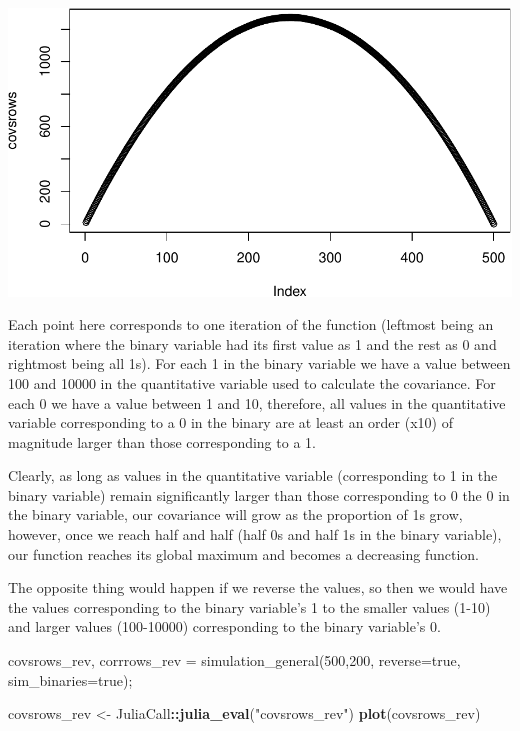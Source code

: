\documentclass[]{article}
\newenvironment{Shaded}{\begin{snugshade}}{\end{snugshade}}
\newcommand{\FloatTok}[1]{\textcolor[rgb]{0.00,0.00,0.81}{#1}}
\newcommand{\KeywordTok}[1]{\textcolor[rgb]{0.13,0.29,0.53}{\textbf{#1}}}
\newcommand{\NormalTok}[1]{#1}
\newcommand{\OperatorTok}[1]{\textcolor[rgb]{0.81,0.36,0.00}{\textbf{#1}}}
\newcommand{\StringTok}[1]{\textcolor[rgb]{0.31,0.60,0.02}{#1}}
\begin{document}
\includegraphics{./figures/unnamed-chunk-11-1.pdf}

Each point here corresponds to one iteration of the function (leftmost
being an iteration where the binary variable had its first value as 1
and the rest as 0 and rightmost being all 1s). For each 1 in the binary
variable we have a value between 100 and 10000 in the quantitative
variable used to calculate the covariance. For each 0 we have a value
between 1 and 10, therefore, all values in the quantitative variable
corresponding to a 0 in the binary are at least an order (x10) of
magnitude larger than those corresponding to a 1.

Clearly, as long as values in the quantitative variable (corresponding
to 1 in the binary variable) remain significantly larger than those
corresponding to 0 the 0 in the binary variable, our covariance will
grow as the proportion of 1s grow, however, once we reach half and half
(half 0s and half 1s in the binary variable), our function reaches its
global maximum and becomes a decreasing function.

\newpage

The opposite thing would happen if we reverse the values, so then we
would have the values corresponding to the binary variable's 1 to the
smaller values (1-10) and larger values (100-10000) corresponding to the
binary variable's 0.

\begin{Shaded}
\begin{Highlighting}[]
\NormalTok{covsrows_rev, corrrows_rev = simulation_general(}\FloatTok{500}\NormalTok{,}\FloatTok{200}\NormalTok{, reverse=true, sim_binaries=true);}
\end{Highlighting}
\end{Shaded}

\begin{Shaded}
\begin{Highlighting}[]
\NormalTok{covsrows_rev <-}\StringTok{ }\NormalTok{JuliaCall}\OperatorTok{::}\KeywordTok{julia_eval}\NormalTok{(}\StringTok{"covsrows_rev"}\NormalTok{)}
\KeywordTok{plot}\NormalTok{(covsrows_rev)}
\end{Highlighting}
\end{Shaded}
\end{document}
